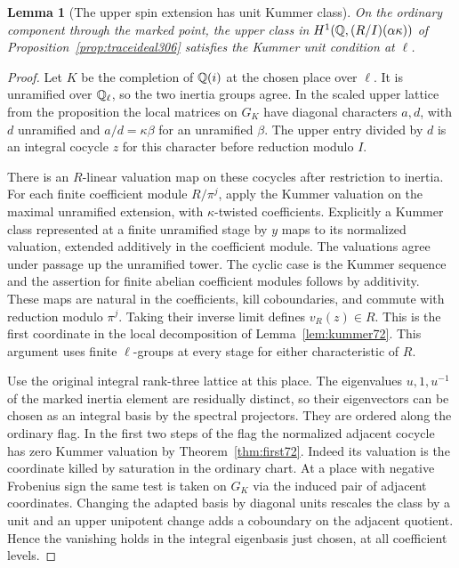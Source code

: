 \documentclass[a4paper,11pt]{article}
\newtheorem{lemma}[proposition]{Lemma}
\theoremstyle{definition}
\theoremstyle{remark}
\numberwithin{equation}{section}
\begin{document}
\begin{lemma}[The upper spin extension has unit Kummer class]\leavevmode
\label{lem:spinunit306}
On the ordinary component through the marked point, the
upper class in \(H^1(\mathbb Q,(R/I)(\alpha\kappa))\) of
Proposition~\ref{prop:traceideal306} satisfies the Kummer
unit condition at \(\ell\).
\end{lemma}
\begin{proof}
Let \(K\) be the completion of \(\mathbb Q(i)\) at the chosen
place over \(\ell\). It is unramified over \(\mathbb Q_\ell\),
so the two inertia groups agree. In the scaled upper lattice
from the proposition the local matrices on \(G_K\) have
diagonal characters \(a,d\), with \(d\) unramified and
\(a/d=\kappa\beta\) for an unramified \(\beta\). The upper
entry divided by \(d\) is an integral cocycle \(z\) for this
character before reduction modulo \(I\).

There is an \(R\)-linear valuation map on these cocycles
after restriction to inertia. For each finite coefficient
module \(R/\pi^j\), apply the Kummer valuation on the maximal
unramified extension, with \(\kappa\)-twisted coefficients.
Explicitly a Kummer class represented at a finite unramified
stage by \(y\) maps to its normalized valuation, extended
additively in the coefficient module. The valuations agree
under passage up the unramified tower. The cyclic case is
the Kummer sequence and the assertion for finite abelian
coefficient modules follows by additivity. These maps are
natural in the coefficients, kill coboundaries, and commute
with reduction modulo \(\pi^j\). Taking their inverse limit
defines \(v_R(z)\in R\). This is the first coordinate in the
local decomposition of Lemma~\ref{lem:kummer72}. This argument
uses finite \(\ell\)-groups at every stage for either
characteristic of \(R\).

Use the original integral rank-three lattice at this place.
The eigenvalues \(u,1,u^{-1}\) of the marked inertia element
are residually distinct, so their eigenvectors can be chosen
as an integral basis by the spectral projectors. They are
ordered along the ordinary flag. In the first two steps of
the flag the normalized adjacent cocycle has zero Kummer
valuation by Theorem~\ref{thm:first72}. Indeed its valuation
is the coordinate killed by saturation in the ordinary
chart. At a place with negative Frobenius sign the same test
is taken on \(G_K\) via the induced pair of adjacent
coordinates. Changing the adapted basis by diagonal units
rescales the class by a unit and an upper unipotent change
adds a coboundary on the adjacent quotient. Hence the
vanishing holds in the integral eigenbasis just chosen,
at all coefficient levels.


\end{proof}
\end{document}
